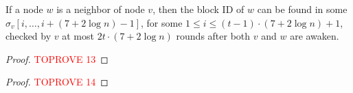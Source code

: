 \documentclass[11pt]{article}
\begin{document}
\begin{lemma}[Inclusion]
\label{lem:beeping-progress}
If a node $w$ is a neighbor of node $v$, 
then the block ID of $w$ can be found in some $\sigma_v[i, \ldots, i+(7+2\log n)-1]$, for some $1\le i\le (t-1)\cdot (7+2\log n)+1$, checked by $v$ at most $2t\cdot (7+2\log n)$ rounds after both $v$ and $w$ are awaken.
\end{lemma}

\begin{proof}\textcolor{red}{TOPROVE 13}\end{proof}



\begin{proof}\textcolor{red}{TOPROVE 14}\end{proof}
\end{document}

